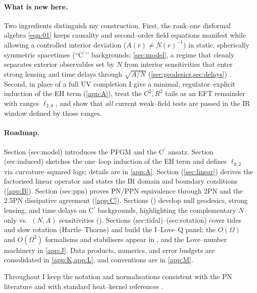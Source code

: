 \documentclass{iopjournal}
\begin{document}
\paragraph{What is new here.}
Two ingredients distinguish my construction. First, the rank–one disformal algebra \eqref{eqn:01} keeps causality and second–order field equations manifest while allowing a controlled interior deviation ($A(r)\neq N(r)^{-1}$) in static, spherically symmetric spacetimes (``C$^\prime$’’ backgrounds; \cref{sec:model}, a regime that cleanly separates exterior observables set by $N$ from interior sensitivities that enter strong lensing and time delays through $\sqrt{A/N}$ (\cref{sec:geodesics,sec:delays}) \cite{Bekenstein1993,BettoniLiberati2013,Perlick2004LRR}. Second, in place of a full UV completion I give a minimal, regulator–explicit induction of the EH term (\cref{app:A}), treat the $C^2,R^2$ tails as an EFT remainder with ranges $\ell_{2,0}$, and show that \emph{all} current weak–field tests are passed in the IR window defined by those ranges.

\paragraph{Roadmap.}
Section (sec:model) introduces the PFGM and the C$^\prime$ ansatz. Section (sec:induced) sketches the one–loop induction of the EH term and defines $\ell_{0,2}$ via curvature–squared logs; details are in \cref{app:A}. Section (\cref{sec:linear}) derives the factorised linear operator and states the IR domain and boundary conditions (\cref{app:B}). Section (sec:ppn) proves PN/PPN equivalence through 2PN and the 2.5PN dissipative agreement (\cref{app:C}). Sections () develop null geodesics, strong lensing, and time delays on C$^\prime$ backgrounds, highlighting the complementary $N$–only vs.\ $(N,A)$ sensitivities (). Sections (sec:tidal)–(sec:rotation) cover tides and slow rotation (Hartle–Thorne) and build the I–Love–Q panel; the $O(\Omega)$ and $O(\Omega^2)$ formalisms and stabilisers appear in , and the Love–number machinery in \cref{app:J}. Data products, numerics, and error budgets are consolidated in \cref{app:K,app:L}, and conventions are in \cref{app:M}.

\medskip
Throughout I keep the notation and normalisations consistent with the PN literature \cite{PoissonWill2014,Blanchet2014LRR} and with standard heat–kernel references \cite{DeWitt1965,ParkerToms,Vassilevich2003}. 
\end{document}
